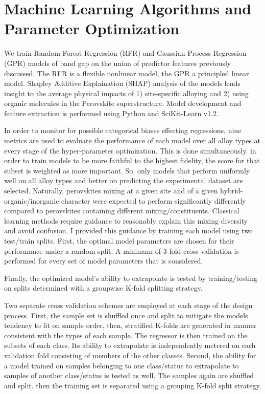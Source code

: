 \section{Machine Learning Algorithms and Parameter Optimization}
\label{sec:orgf7d8230}
We train Random Forest Regression (RFR) and Gaussian Process Regression (GPR) models of band gap on the union of predictor features previously discussed.
The RFR is a flexible nonlinear model, the GPR a principled linear model.
Shapley Additive Explaination (SHAP) analysis of the models lends insight to the average physical impacts of 1) site-specific alloying and 2) using organic molecules in the Perovskite superstructure.
Model development and feature extraction is performed using Python and SciKit-Learn v1.2.
\autocite{pedregosa-2011-scikit-learn} 

In order to monitor for possible categorical biases effecting regressions, nine metrics are used to evaluate the performance of each model over all alloy types at every stage of the hyper-parameter optimization.
This is done simultaneously.
in order to train models to be more faithful to the highest fidelity, the score for that subset is weighted as more important.
So, only models that perform uniformly well on all alloy types and better on predicting the experimental dataset are selected.
Naturally, perovskites mixing at a given site and of a given hybrid-organic/inorganic character were expected to perform significantly differently compared to perovskites containing different mixing/constituents.
Classical learning methods require guidance to reasonably explain this mixing diversity and avoid confusion.
I provided this guidance by training each model using two test/train splits.
First, the optimal model parameters are chosen for their performance under a random split.
A minimum of 3-fold cross-validation is performed for every set of model parameters that is considered.

Finally, the optimized model's ability to extrapolate is
tested by training/testing on splits determined with a groupwise K-fold splitting strategy.

Two separate cross validation schemes are employed at each stage of the design process.
First, the sample set is shuffled once and split to mitigate the models tendency to fit on sample order, then, stratified K-folds are generated in manner consistent with the types of each sample.
The regressor is then trained on the subsets of each class.
Its ability to extrapolate is independently metered on each validation fold consisting of members of the other classes.
Second, the ability for a model trained on samples belonging to one class/status to extrapolate to samples of another class/status is tested as well.
The samples again are shuffled and split.
then the training set is separated using a grouping K-fold split strategy.

